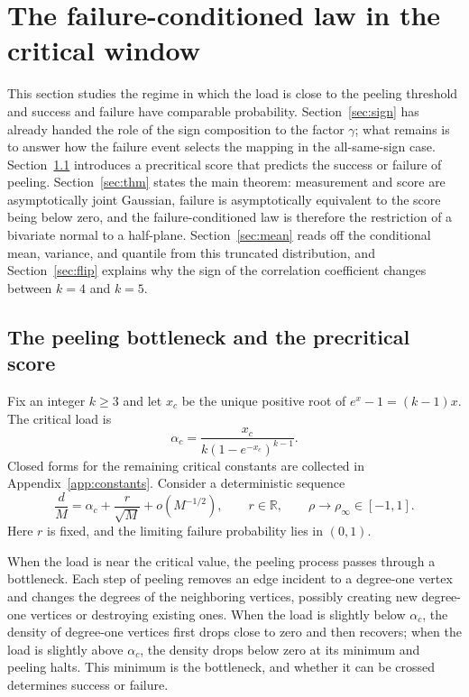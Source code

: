 \section{The failure-conditioned law in the critical window}\label{sec:window}
This section studies the regime in which the load is close to the peeling threshold and success and failure have comparable
probability. Section~\ref{sec:sign} has already handed the role of the sign composition to the factor $\gamma$; what remains is to
answer how the failure event selects the mapping in the all-same-sign case. Section~\ref{sec:score} introduces a precritical score
that predicts the success or failure of peeling. Section~\ref{sec:thm} states the main theorem: measurement and score are
asymptotically joint Gaussian, failure is asymptotically equivalent to the score being below zero, and the failure-conditioned law is
therefore the restriction of a bivariate normal to a half-plane. Section~\ref{sec:mean} reads off the conditional mean, variance, and
quantile from this truncated distribution, and Section~\ref{sec:flip} explains why the sign of the correlation coefficient changes
between $k=4$ and $k=5$.

\subsection{The peeling bottleneck and the precritical score}\label{sec:score}
Fix an integer $k\ge3$ and let $x_c$ be the unique positive root of $e^{x}-1=(k-1)x$.
The critical load is\cite{molloy,dn,jl07}
\begin{equation*}
\alpha_c=\frac{x_c}{k(1-e^{-x_c})^{k-1}}.
\end{equation*}
Closed forms for the remaining critical constants are collected in Appendix~\ref{app:constants}. Consider a deterministic sequence
\begin{equation}
\frac dM=\alpha_c+\frac r{\sqrt M}+o(M^{-1/2}),\qquad
r\in\mathbb R,\qquad\rho\longrightarrow\rho_\infty\in[-1,1].\label{eq:window}
\end{equation}
Here $r$ is fixed, and the limiting failure probability lies in $(0,1)$.

When the load is near the critical value, the peeling process passes through a bottleneck. Each step of peeling removes an edge
incident to a degree-one vertex and changes the degrees of the neighboring vertices, possibly creating new degree-one vertices or
destroying existing ones. When the load is slightly below $\alpha_c$, the density of degree-one vertices first drops close to zero and
then recovers; when the load is slightly above $\alpha_c$, the density drops below zero at its minimum and peeling halts. This minimum is
the bottleneck, and whether it can be crossed determines success or failure.

